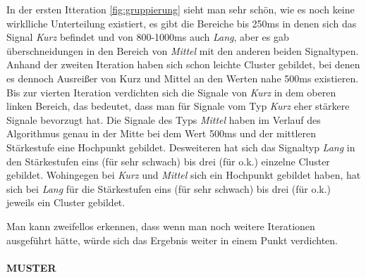 In der ersten Itteration \autoref{fig:gruppierung} sieht man sehr sch{\"o}n, wie es noch keine wirklliche Unterteilung existiert, es gibt die Bereiche bis 250ms in denen sich das Signal \textit{Kurz} befindet und von 800-1000ms auch \textit{Lang}, aber es gab {\"u}berschneidungen in den Bereich von \textit{Mittel} mit den anderen beiden Signaltypen. 
Anhand der zweiten Iteration haben sich schon leichte Cluster gebildet, bei denen es dennoch Ausrei{\ss}er von Kurz und Mittel an den Werten nahe 500ms existieren. 
Bis zur vierten Iteration verdichten sich die Signale von \textit{Kurz} in dem oberen linken Bereich, das bedeutet, dass man f{\"u}r Signale vom Typ \textit{Kurz} eher st{\"a}rkere Signale bevorzugt hat. 
Die Signale des Typs \textit{Mittel} haben im Verlauf des Algorithmus genau in der Mitte bei dem Wert 500ms und der mittleren St{\"a}rkestufe eine Hochpunkt gebildet. 
Desweiteren hat sich das Signaltyp \textit{Lang} in den St{\"a}rkestufen eins (f{\"u}r sehr schwach) bis drei (f{\"u}r o.k.) einzelne Cluster gebildet. 
Wohingegen bei \textit{Kurz} und \textit{Mittel} sich ein Hochpunkt gebildet haben, hat sich bei \textit{Lang} f{\"u}r die St{\"a}rkestufen eins (f{\"u}r sehr schwach) bis drei (f{\"u}r o.k.) jeweils ein Cluster gebildet.

Man kann zweifellos erkennen, dass wenn man noch weitere Iterationen ausgef{\"u}hrt h{\"a}tte, w{\"u}rde sich das Ergebnis weiter in einem Punkt verdichten. 



\paragraph{MUSTER}

